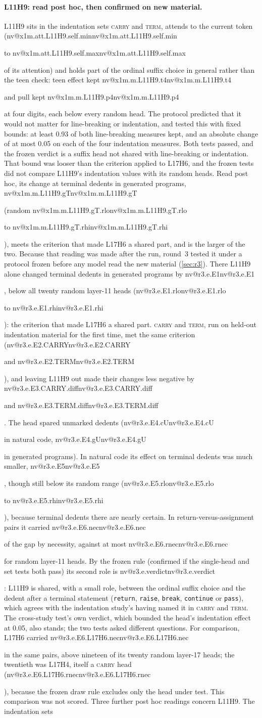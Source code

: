 \documentclass[11pt]{article}
\makeatletter
\newcommand{\nv}[1]{\ifcsname nv@#1\endcsname\csname nv@#1\endcsname\else\PackageError{numbers}{Unknown number key #1}{}\fi}
\newcommand{\hd}[2]{L#1H#2}
\newcommand{\code}[1]{\texttt{#1}}
\newcommand{\term}{\textsc{term}}
\newcommand{\carry}{\textsc{carry}}
\newcommand{\xm}[2]{\nv{x1m.m.#1.#2}}
\newcommand{\xr}[2]{\nv{x1m.m.#1.#2.rlo} to \nv{x1m.m.#1.#2.rhi}}
\makeatother
\begin{document}
\paragraph{\hd{11}{9}: read post hoc, then confirmed on new material.} \hd{11}{9} sits in the indentation sets \carry{} and \term{}, attends to the current token (\nv{x1m.att.L11H9.self.min} to \nv{x1m.att.L11H9.self.max} of its attention) and holds part of the ordinal suffix choice in general rather than the teen check: teen effect kept \xm{L11H9}{t4} and pull kept \xm{L11H9}{p4} at four digits, each below every random head. The protocol predicted that it would not matter for line-breaking or indentation, and tested this with fixed bounds: at least 0.93 of both line-breaking measures kept, and an absolute change of at most 0.05 on each of the four indentation measures. Both tests passed, and the frozen verdict is a suffix head not shared with line-breaking or indentation. That bound was looser than the criterion applied to \hd{17}{6}, and the frozen tests did not compare \hd{11}{9}'s indentation values with its random heads. Read post hoc, its change at terminal dedents in generated programs, \xm{L11H9}{gT} (random \xr{L11H9}{gT}), meets the criterion that made \hd{17}{6} a shared part, and is the larger of the two. Because that reading was made after the run, round~3 tested it under a protocol frozen before any model read the new material (\cref{sec:r3}). There \hd{11}{9} alone changed terminal dedents in generated programs by \nv{r3.e.E1}, below all twenty random layer-11 heads (\nv{r3.e.E1.rlo} to \nv{r3.e.E1.rhi}): the criterion that made \hd{17}{6} a shared part. \carry{} and \term{}, run on held-out indentation material for the first time, met the same criterion (\nv{r3.e.E2.CARRY} and \nv{r3.e.E2.TERM}), and leaving \hd{11}{9} out made their changes less negative by \nv{r3.e.E3.CARRY.diff} and \nv{r3.e.E3.TERM.diff}. The head spared unmarked dedents (\nv{r3.e.E4.cU} in natural code, \nv{r3.e.E4.gU} in generated programs). In natural code its effect on terminal dedents was much smaller, \nv{r3.e.E5}, though still below its random range (\nv{r3.e.E5.rlo} to \nv{r3.e.E5.rhi}), because terminal dedents there are nearly certain. In return-versus-assignment pairs it carried \nv{r3.e.E6.nec} of the gap by necessity, against at most \nv{r3.e.E6.rnec} for random layer-11 heads. By the frozen rule (confirmed if the single-head and set tests both pass) its second role is \nv{r3.e.verdict}: \hd{11}{9} is shared, with a small role, between the ordinal suffix choice and the dedent after a terminal statement (\code{return}, \code{raise}, \code{break}, \code{continue} or \code{pass}), which agrees with the indentation study's having named it in \carry{} and \term{}. The cross-study test's own verdict, which bounded the head's indentation effect at 0.05, also stands; the two tests asked different questions. For comparison, \hd{17}{6} carried \nv{r3.e.E6.L17H6.nec} in the same pairs, above nineteen of its twenty random layer-17 heads; the twentieth was \hd{17}{4}, itself a \carry{} head (\nv{r3.e.E6.L17H6.rnec}), because the frozen draw rule excludes only the head under test. This comparison was not scored. Three further post hoc readings concern \hd{11}{9}. The indentation sets 
\end{document}
